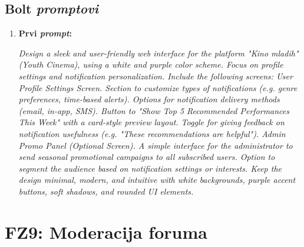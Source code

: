 \subsection{Bolt \textit{promptovi}}

\begin{enumerate}[itemsep=1ex]
    \item \textbf{Prvi \textit{prompt}:}

    \textit{
    Design a sleek and user-friendly web interface for the platform "Kino mladih" (Youth Cinema), using a white and purple color scheme. Focus on profile settings and notification personalization. Include the following screens: User Profile Settings Screen. Section to customize types of notifications (e.g. genre preferences, time-based alerts). Options for notification delivery methods (email, in-app, SMS). Button to "Show Top 5 Recommended Performances This Week" with a card-style preview layout. Toggle for giving feedback on notification usefulness (e.g. "These recommendations are helpful"). Admin Promo Panel (Optional Screen). A simple interface for the administrator to send seasonal promotional campaigns to all subscribed users. Option to segment the audience based on notification settings or interests. Keep the design minimal, modern, and intuitive with white backgrounds, purple accent buttons, soft shadows, and rounded UI elements.}
\end{enumerate}
\sloppy  
\section{FZ9: Moderacija foruma}  

\sloppy  
